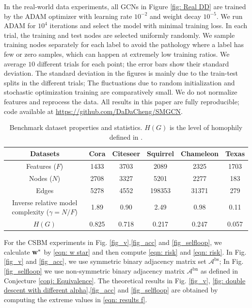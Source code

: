 \documentclass[9pt,twocolumn]{pnas-new}
\begin{document}
In the real-world data experiments, all GCNs in Figure \ref{fig: Real DD} are trained by the ADAM optimizer with learning rate $10^{-2}$  and weight decay $10^{-5}$. We run ADAM for $10^4$ iterations and select the model with minimal training loss. In each trial, the training and test nodes are selected uniformly randomly. We sample training nodes separately for each label to avoid the pathology where a label has few or zero samples, which can happen at extremely low training ratios. We average $10$ different trials for each point; the error bars show their standard deviation. The standard deviation in the figures is mainly due to the train-test splits in the different trials; The fluctuations due to random initialization and stochastic optimization training are comparatively small. We do not normalize features and reprocess the data. All results in this paper are fully reproducible; code available at \url{https://github.com/DaDaCheng/SMGCN}.


\begin{table}[!h]
\centering
\begin{tabular}{c|ccccc}
Datasets                              & Cora  & Citeseer & Squirrel & Chameleon & Texas \\ \hline
Features ($F$)                       & 1433  & 3703     & 2089     & 2325      & 1703  \\
Nodes ($N$)                          & 2708  & 3327     & 5201     & 2277      & 183   \\
Edges                                & 5278  & 4552     & 198353   & 31371     & 279   \\
Inverse relative model complexity ($\gamma=N/F$) & 1.89  & 0.90     & 2.49     & 0.98      & 0.11  \\
$H(G)$                               & 0.825 & 0.718    & 0.217    & 0.247     & 0.057
\end{tabular}
\caption{Benchmark dataset properties and statistics. $H(G)$ is the level of homophily defined in \cite{pei2020geom}.}
\end{table}


For the CSBM experiments in Fig. \ref{fig_v},\ref{fig_acc} and \ref{fig_selfloop}, we calculate $\mathbf{w}^*$ by \eqref{eqn: w star} and then compute \eqref{eqn: risk} and \eqref{eqn: risk}. In Fig. \ref{fig_v} and \ref{fig_acc}, we use symmetric binary adjacency matrix set $\mathcal{A}^{\text{bs}}$; In Fig. \ref{fig_selfloop} we use non-symmetric binary adjacency matrix $\mathcal{A}^{\text{bn}}$ as defined in Conjecture \ref{conj: Equivalence}. The theoretical results in Fig. \ref{fig_v}, \ref{fig: double descent with different alpha},\ref{fig_acc} and \ref{fig_selfloop} are obtained by computing the extreme values in \ref{eqn: results f}.
\end{document}
